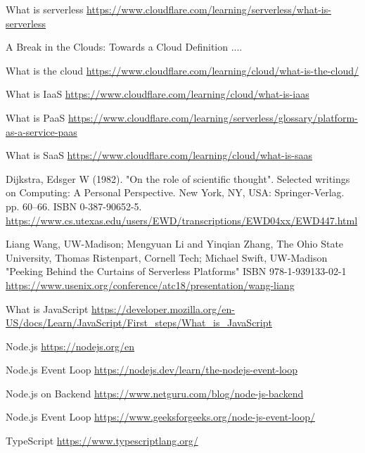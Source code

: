 \begin{thebibliography}{9}

     What is serverless
    \url{https://www.cloudflare.com/learning/serverless/what-is-serverless}

     A Break in the Clouds: Towards a Cloud
    Deﬁnition ....

     What is the cloud
    \url{https://www.cloudflare.com/learning/cloud/what-is-the-cloud/}

     What is IaaS
    \url{https://www.cloudflare.com/learning/cloud/what-is-iaas}

     What is PaaS
    \url{https://www.cloudflare.com/learning/serverless/glossary/platform-as-a-service-paas}

     What is SaaS
    \url{https://www.cloudflare.com/learning/cloud/what-is-saas}

      Dijkstra, Edsger W (1982).
    "On the role of scientific thought". Selected writings on Computing: A Personal
    Perspective. New York, NY, USA: Springer-Verlag. pp. 60–66. ISBN 0-387-90652-5.
    \url{https://www.cs.utexas.edu/users/EWD/transcriptions/EWD04xx/EWD447.html}

    Liang Wang, UW-Madison; Mengyuan Li and Yinqian Zhang, The Ohio State University,
    Thomas Ristenpart, Cornell Tech; Michael Swift, UW-Madison
    "Peeking Behind the Curtains of Serverless Platforms"
    ISBN 978-1-939133-02-1
    \url{https://www.usenix.org/conference/atc18/presentation/wang-liang}

     What is JavaScript
    \url{https://developer.mozilla.org/en-US/docs/Learn/JavaScript/First_steps/What_is_JavaScript}

     Node.js
    \url{https://nodejs.org/en}

     Node.js Event Loop
    \url{https://nodejs.dev/learn/the-nodejs-event-loop}

     Node.js on Backend
    \url{https://www.netguru.com/blog/node-js-backend}

     Node.js Event Loop
    \url{https://www.geeksforgeeks.org/node-js-event-loop/}

     TypeScript
    \url{https://www.typescriptlang.org/}


\end{thebibliography}

